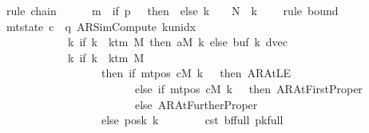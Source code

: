 \begin{isabellebody}
\ {\isacharparenleft}{\kern0pt}rule\ chain{\isacharparenright}{\kern0pt}\isanewline
\ \ \ \ \isamarkupfalse%
\ {\isachardoublequoteopen}m{}\ {\isacharplus}{\kern0pt}\ {\isacharparenleft}{\kern0pt}if\ {\isacharquery}{\kern0pt}p\ {\isacharequal}{\kern0pt}\ {}\ then\ {}\ else\ {\isacharquery}{\kern0pt}k\ {\isacharplus}{\kern0pt}\ {}{\isacharparenright}{\kern0pt}\ {\isasymle}\ {\isacharquery}{\kern0pt}N\ {\isacharasterisk}{\kern0pt}\ {\isacharparenleft}{\kern0pt}{\isacharquery}{\kern0pt}k\ {\isacharplus}{\kern0pt}\ {}{\isacharparenright}{\kern0pt}{\isachardoublequoteclose}\ \isamarkupfalse%
\ {\isacharparenleft}{\kern0pt}rule\ bound{\isacharparenright}{\kern0pt}\isanewline
\ \ \ \ \isamarkupfalse%
\ {\isachardoublequoteopen}mt{\isacharunderscore}{\kern0pt}state\ c{}\ {\isacharequal}{\kern0pt}\ {\isacharparenleft}{\kern0pt}q{\isacharcomma}{\kern0pt}\ AR{\isacharunderscore}{\kern0pt}SimCompute{\isacharcomma}{\kern0pt}\ k{\isacharunderscore}{\kern0pt}unidx\ {}{\isacharcomma}{\kern0pt}\ {}{\isacharcomma}{\kern0pt}\isanewline
\ \ \ \ \ \ \ \ \ \ \ \ {\isacharparenleft}{\kern0pt}{\isasymlambda}k{\isachardot}{\kern0pt}\ if\ k\ {\isacharless}{\kern0pt}\ k{\isacharunderscore}{\kern0pt}tm\ M\ then\ {\isacharquery}{\kern0pt}aM\ k\ else\ buf{}\ k{\isacharparenright}{\kern0pt}{\isacharcomma}{\kern0pt}\ dvec{\isacharcomma}{\kern0pt}\isanewline
\ \ \ \ \ \ \ \ \ \ \ \ {\isacharparenleft}{\kern0pt}{\isasymlambda}k{\isachardot}{\kern0pt}\ if\ k\ {\isacharless}{\kern0pt}\ k{\isacharunderscore}{\kern0pt}tm\ M\isanewline
\ \ \ \ \ \ \ \ \ \ \ \ \ \ \ \ \ \ then\ {\isacharparenleft}{\kern0pt}if\ mt{\isacharunderscore}{\kern0pt}pos\ cM\ k\ {\isacharequal}{\kern0pt}\ {}\ then\ AR{\isacharunderscore}{\kern0pt}AtLE\isanewline
\ \ \ \ \ \ \ \ \ \ \ \ \ \ \ \ \ \ \ \ \ \ \ \ else\ if\ mt{\isacharunderscore}{\kern0pt}pos\ cM\ k\ {\isacharequal}{\kern0pt}\ {}\ then\ AR{\isacharunderscore}{\kern0pt}AtFirstProper\isanewline
\ \ \ \ \ \ \ \ \ \ \ \ \ \ \ \ \ \ \ \ \ \ \ \ else\ AR{\isacharunderscore}{\kern0pt}AtFurtherProper{\isacharparenright}{\kern0pt}\isanewline
\ \ \ \ \ \ \ \ \ \ \ \ \ \ \ \ \ \ else\ posk{}\ k{\isacharparenright}{\kern0pt}{\isacharparenright}{\kern0pt}{\isachardoublequoteclose}\isanewline
\ \ \ \ \ \ \isamarkupfalse%
\ c{}{\isacharunderscore}{\kern0pt}st\ bf{\isacharunderscore}{\kern0pt}full\ pk{\isacharunderscore}{\kern0pt}full\ \isamarkupfalse%

\end{isabellebody}
